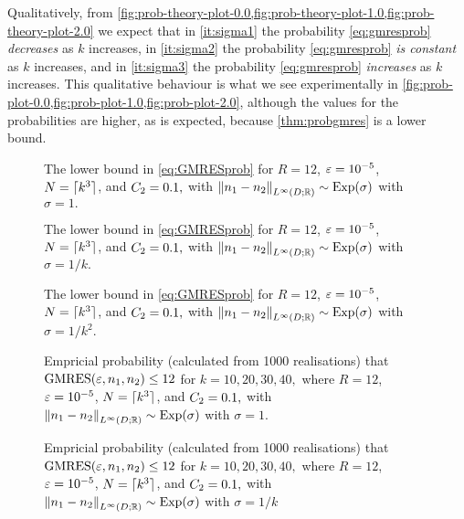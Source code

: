     Qualitatively, from \cref{fig:prob-theory-plot-0.0,fig:prob-theory-plot-1.0,fig:prob-theory-plot-2.0} we expect that in \cref{it:sigma1} the probability \cref{eq:gmresprob} \emph{decreases} as $k$ increases, in \cref{it:sigma2} the probability \cref{eq:gmresprob} \emph{is constant} as $k$ increases, and in \cref{it:sigma3} the probability \cref{eq:gmresprob} \emph{increases} as $k$ increases. This qualitative behaviour is what we see experimentally in \cref{fig:prob-plot-0.0,fig:prob-plot-1.0,fig:prob-plot-2.0}, although the values for the probabilities are higher, as is expected, because \cref{thm:probgmres} is a lower bound.

\begin{figure}[h]
    \centering

\caption{The lower bound in \cref{eq:GMRESprob} for $R=12$, $\varepsilon = 10^{-5}$, $N = \lceil k^{3}\rceil$, and $C_{2}=0.1,$ with $\NLiDRR{\no-\nt} \sim \Exp{\sigma}$ with $\sigma = 1.$\label{fig:prob-theory-plot-0.0}}
\end{figure}

\begin{figure}[h]
    \centering

\caption{The lower bound in \cref{eq:GMRESprob} for $R=12$, $\varepsilon = 10^{-5}$, $N = \lceil k^{3}\rceil$, and $C_{2}=0.1,$ with $\NLiDRR{\no-\nt} \sim \Exp{\sigma}$ with $\sigma = 1/k.$\label{fig:prob-theory-plot-1.0}}
\end{figure}

\begin{figure}[h]
    \centering
    
    \caption{The lower bound in \cref{eq:GMRESprob} for $R=12$, $\varepsilon = 10^{-5}$, $N = \lceil k^{3}\rceil$, and $C_{2}=0.1,$ with $\NLiDRR{\no-\nt} \sim \Exp{\sigma}$ with $\sigma = 1/k^2.$\label{fig:prob-theory-plot-2.0}}
\end{figure}
\begin{figure}[h]
    \centering

\caption{Empricial probability (calculated from 1000 realisations) that $\GMRES{\eps}{\no}{\nt}\leq 12$ for $k = 10, 20, 30, 40,$ where $R=12$, $\varepsilon = 10^{-5}$, $N = \lceil k^{3}\rceil$, and $C_{2}=0.1,$ with $\NLiDRR{\no-\nt} \sim \Exp{\sigma}$ with $\sigma = 1.$\label{fig:prob-plot-0.0}}
\end{figure}

\begin{figure}[h]
    \centering

\caption{Empricial probability (calculated from 1000 realisations) that $\GMRES{\eps}{\no}{\nt}\leq 12$ for $k = 10, 20, 30, 40,$ where $R=12$, $\varepsilon = 10^{-5}$, $N = \lceil k^{3}\rceil$, and $C_{2}=0.1,$ with $\NLiDRR{\no-\nt} \sim \Exp{\sigma}$ with $\sigma = 1/k$\label{fig:prob-plot-1.0}}
\end{figure}

